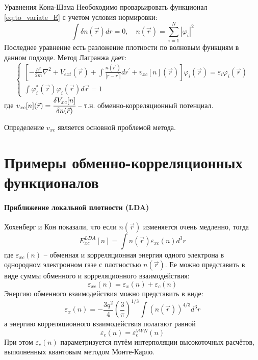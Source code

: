 \documentclass[t]{beamer}  %
\begin{document}
\begin{frame}{Уравнения Кона-Шэма}
    Необоходимо проварьировать функционал \ref{eq:to_variate_E} с учетом условия нормировки:
    \begin{equation}
        \int \delta n(\vec{r}) dr = 0, \quad n(\vec{r})=\sum_{i=1}^{N}\left|\varphi_{i}\right|^{2} 
    \end{equation}
    Последнее уравнение есть разложение плотности по волновым функциям в данном подходе.
    Метод Лагранжа дает:
    \begin{equation}
        \left\{\begin{array}{l}
{\left[-\frac{\hbar^{2}}{2 m} \nabla^{2}+V_{ext}(\vec{r})+
    \int \frac{n\left(r^{\prime}\right)}{\left|r-r^{\prime}\right|} d r^{\prime} + v_{xc}[n](\vec{r})\right] 
    \varphi_{i}(\vec{r})=
\varepsilon_{i} \varphi_{i}(\vec{r})} \\
\int \varphi_{i}^{*}(\vec{r}) \varphi_{i}(\vec{r}) d \vec{r}=1
\end{array}\right.
    \end{equation}
    где $v_{xc}[n](\vec{r}) = \cfrac{\delta V_{x c}[n]}{\delta n(\vec{r})}$ -- т.н. обменно-корреляционный потенциал.

    Определение $v_{xc}$ является основной проблемой метода.

\end{frame}

\section{Примеры обменно-корреляционных функционалов}

\begin{frame}[shrink=25]{\insertsection}
    \framesubtitle{Приближение локальной плотности (LDA)}
    Хохенберг и Кон показали, что если $n(\vec{r})$ изменяется очень медленно, тогда
    \begin{equation}
        E_{xc}^{LDA}[n]=\int n(\vec{r}) \varepsilon_{xc}(n) d^3 r
    \end{equation}
    где $\varepsilon_{xc}(n)$ -- обменная и корреляционная энергия одного электрона в однородном электронном газе с плотностью $n(\vec{r})$. Ее можно представить в виде суммы обменного и корреляционного взаимодействия:
    \begin{equation}
        \varepsilon_{xc}(n) = \varepsilon_{x}(n) + \varepsilon_{c}(n) 
    \end{equation}
    Энергию обменного взаимодействия можно представить в виде:
    \begin{equation}
        \varepsilon_{x}(n)=-\frac{3 q^{2}}{4}\left(\frac{3}{\pi}\right)^{1 / 3} \int(n(\vec{r}))^{4 / 3} d^{3} r
    \end{equation}
    а энергию корреляционного взаимодействия полагают равной
    \begin{equation}
        \varepsilon_{c}(n)=\varepsilon_{c}^{V W N}(n)
    \end{equation}
    При этом $\varepsilon_{c}(n)$ параметризуется путём интерполяции высокоточных расчётов, выполненных квантовым методом Монте-Карло.
\end{frame}
\end{document}
